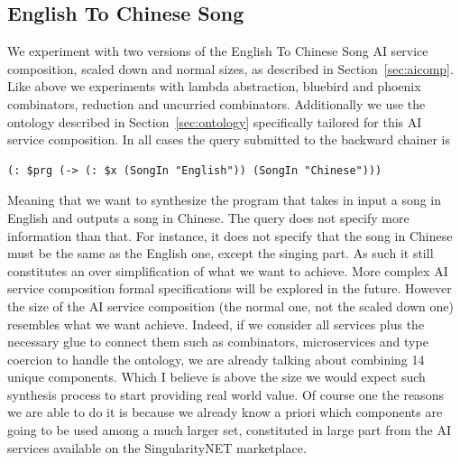 \documentclass[]{report}
\begin{document}
\subsection{English To Chinese Song}
\label{sec:etcs}
We experiment with two versions of the English To Chinese Song AI
service composition, scaled down and normal sizes, as described in
Section~\ref{sec:aicomp}.  Like above we experiments with lambda
abstraction, bluebird and phoenix combinators, reduction and uncurried
combinators.  Additionally we use the ontology described in
Section~\ref{sec:ontology} specifically tailored for this AI service
composition.  In all cases the query submitted to the backward chainer
is
\begin{verbatim}
(: $prg (-> (: $x (SongIn "English")) (SongIn "Chinese")))
\end{verbatim}
Meaning that we want to synthesize the program that takes in input a
song in English and outputs a song in Chinese.  The query does not
specify more information than that.  For instance, it does not specify
that the song in Chinese must be the same as the English one, except
the singing part.  As such it still constitutes an over simplification
of what we want to achieve.  More complex AI service composition
formal specifications will be explored in the future.  However the
size of the AI service composition (the normal one, not the scaled
down one) resembles what we want achieve.  Indeed, if we consider all
services plus the necessary glue to connect them such as combinators,
microservices and type coercion to handle the ontology, we are already
talking about combining 14 unique components.  Which I believe is
above the size we would expect such synthesis process to start
providing real world value.  Of course one the reasons we are able to
do it is because we already know a priori which components are going
to be used among a much larger set, constituted in large part from the
AI services available on the SingularityNET marketplace.
\end{document}
